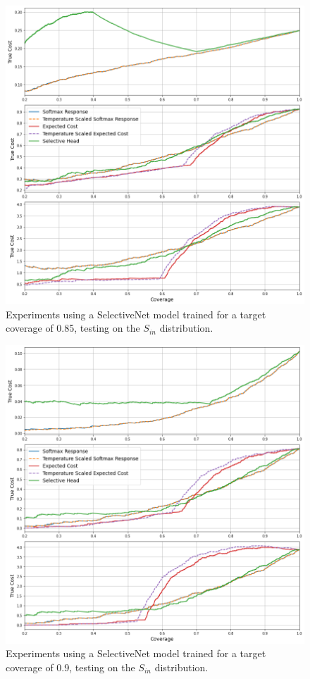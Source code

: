 \begin{figure}[H]
	\includegraphics[width=\textwidth]{images/binary/sn0.85_combine_distribution.png}
	\caption*{Experiments using a SelectiveNet model trained for a target coverage of 0.85, testing on the $S_{in}$ distribution.}
\end{figure}

\begin{figure}[H]
	\includegraphics[width=\textwidth]{images/binary/sn0.9_in_distribution.png}
	\caption*{Experiments using a SelectiveNet model trained for a target coverage of 0.9, testing on the $S_{in}$ distribution.}
\end{figure}

